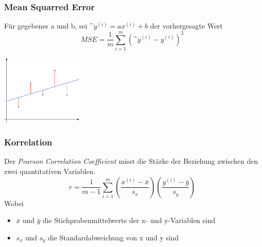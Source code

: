\documentclass{article}
\newenvironment{Figure}
	{\par\medskip\noindent\minipage{\linewidth}}
	{\endminipage\par\medskip}
\theoremstyle{merke}
\theoremstyle{definition}
\begin{document}
            \subsubsection{Mean Squarred Error}
            Für gegebenes a und b, sei $\^{y}^{(i)} = ax^{(i)} + b$ der vorhergesagte Wert
            \begin{equation}
                MSE = \frac{1}{m} \sum^m_{i=1} (\^{y}^{(i)} - y^{(i)})^2
            \end{equation}

            \begin{Figure}
            \centering
            \includegraphics[width=150px]{img/GoalSLR.png}
                \label{fig:Ein Beispiel für den Unterschied von Bivariate und Multivariate Modelle}
            \end{Figure}
            
            \subsubsection{Korrelation}
            Der \textit{Pearson Correlation Coefficient} misst die Stärke der Beziehung zwischen den zwei quantitativen Variablen.
            \begin{equation}
                r = \frac{1}{m-1} \sum^m_{i=1} (\frac{x^{(i)} - \bar{x}}{s_x}) (\frac{y^{(i)} - \bar{y}}{s_y})
            \end{equation}
            Wobei
            \begin{itemize}
                \item $\bar{x}$ und $\bar{y}$ die Stichprobenmittelwerte der x- und y-Variablen sind
                \item $s_x$ und $s_y$ die Standardabweichung von x und y sind
            \end{itemize}
		
\end{document}
